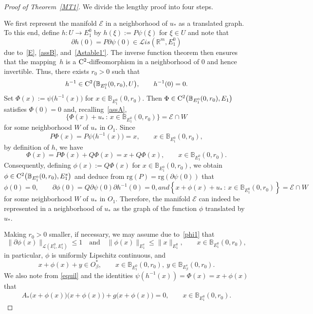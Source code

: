 \documentclass[reqno,11pt]{amsart}
\numberwithin{equation}{section}
\newcommand{\R}{\mathbb{R}}
\theoremstyle{remark}
\begin{document}
\begin{proof}[Proof of Theorem~\ref{MT1}]  We divide the lengthy proof into four steps.\medskip

  We first represent the manifold $\mathcal{E}$  in a neighborhood of $u_*$ as a translated graph. 
To this end, define $h:U\to E_1^0$ by 
$h(\xi):=P\psi(\xi)$ for $\xi\in U$ and note that
$$\partial h(0)=P\partial\psi(0)\in \mathcal{L}is(\R^m,E_1^0)$$ 
due to~\eqref{E},  \eqref{assB}, and~\eqref{Astable1'}. The inverse function theorem then ensures that the mapping~$h$ is a ${\rm C}^{2}$-diffeomorphism in a neighborhood of $0$ and hence invertible. 
Thus, there exists $r_0>0$ such that
$$
h^{-1}\in {\rm C}^2\big(\mathbb{B}_{E_1^0}(0,r_0),U\big), \qquad h^{-1}(0)=0.
$$ 
Set $\Phi(x):=\psi\big(h^{-1}(x)\big)$ for $x\in \mathbb{B}_{E_1^0}(0,r_0)$. Then $\Phi\in {\rm C}^{2}\big(\mathbb{B}_{E_1^0}(0,r_0),E_1\big)$ satisfies $\Phi(0)=0$ and, recalling~\eqref{assA},
$$
\big\{\Phi(x)+u_*\,:\, x\in \mathbb{B}_{E_1^0}(0,r_0)\}=\mathcal{E}\cap W
$$
for some neighborhood $W$ of $u_*$ in $O_1$. Since 
$$
P\Phi(x)= P\psi\big(h^{-1}(x)\big)=x, \qquad x\in \mathbb{B}_{E_1^0}(0,r_0),
$$
by definition of $h$, we have
$$
\Phi(x)= P\Phi(x)+Q\Phi(x)=x+Q\Phi(x), \qquad x\in \mathbb{B}_{E_1^0}(0,r_0).
$$
Consequently, defining  $\phi(x):=Q\Phi(x)$ for $x\in \mathbb{B}_{E_1^0}(0,r_0)$, we obtain $\phi\in {\rm C}^{2}\big(\mathbb{B}_{E_1^0}(0,r_0),E_1^s\big)$ and deduce from   $\mathrm{rg}(P)=\mathrm{rg}(\partial\psi(0))$
that
\begin{subequations}\label{phi}
\begin{equation}\label{phi1}
 \phi(0)=0, \qquad \partial\phi(0)=Q\partial\psi(0)\partial h^{-1}(0)=0,
\end{equation}
and
\begin{equation}\label{phi2}
 \left\{x+\phi(x)+u_*\,:\, x\in \mathbb{B}_{E_1^0}(0,r_0)\right\}=\mathcal{E}\cap W
\end{equation}
\end{subequations}
for some neighborhood $W$ of $u_*$ in $O_1$. 
Therefore, the manifold $\mathcal{E}$ can indeed be represented in a neighborhood of $u_*$ as the graph of the function $\phi$ translated by $u_*$. 

Making $r_0>0$ smaller, if necessary, we may assume due to~\eqref{phi1} that
\begin{equation}\label{n9}
\|\partial \phi(x)\|_{\mathcal{L}(E_1^0,E_1^s)}\le 1   \quad\text{and}\quad \|\phi(x)\|_{E_1^s}\le \|x\|_{E_1^0}, \qquad  x\in \mathbb{B}_{E_1^0}(0,r_0),
\end{equation}
in particular, $\phi$ is uniformly Lipschitz continuous, and
\begin{equation}\label{n9b}
x+ \phi(x) +y\in  O_\beta^*, \qquad x\in \mathbb{B}_{E_1^0}(0,r_0),\ y\in \mathbb{B}_{E_\beta^s}(0,r_0).
\end{equation}
We also note from \eqref{equil} and the identities $\psi(h^{-1}(x)) =\Phi(x)=x+\phi(x)$  that
\begin{align}\label{n8}
A_*\big(x+\phi(x)\big)\big(x+\phi(x)\big)+g\big(x+\phi(x)\big)=0, \qquad x\in \mathbb{B}_{E_1^0}(0,r_0).
\end{align}



\end{proof}
\end{document}
